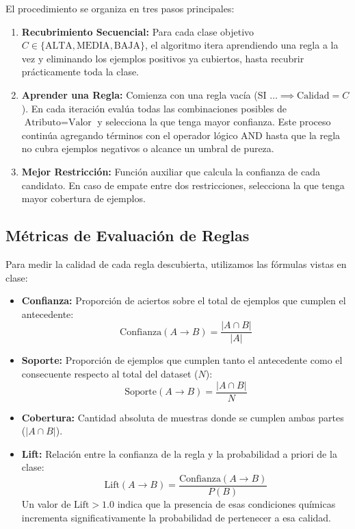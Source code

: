 \documentclass[11pt,a4paper]{article}
\begin{document}
El procedimiento se organiza en tres pasos principales:
\begin{enumerate}
    \item \textbf{Recubrimiento Secuencial:} Para cada clase objetivo $C \in \{\text{ALTA}, \text{MEDIA}, \text{BAJA}\}$, el algoritmo itera aprendiendo una regla a la vez y eliminando los ejemplos positivos ya cubiertos, hasta recubrir prácticamente toda la clase.
    \item \textbf{Aprender una Regla:} Comienza con una regla vacía ($\text{SI } \dots \implies \text{Calidad} = C$). En cada iteración evalúa todas las combinaciones posibles de $\text{Atributo} = \text{Valor}$ y selecciona la que tenga mayor confianza. Este proceso continúa agregando términos con el operador lógico AND hasta que la regla no cubra ejemplos negativos o alcance un umbral de pureza.
    \item \textbf{Mejor Restricción:} Función auxiliar que calcula la confianza de cada candidato. En caso de empate entre dos restricciones, selecciona la que tenga mayor cobertura de ejemplos.
\end{enumerate}

\subsection{Métricas de Evaluación de Reglas}
Para medir la calidad de cada regla descubierta, utilizamos las fórmulas vistas en clase:
\begin{itemize}
    \item \textbf{Confianza:} Proporción de aciertos sobre el total de ejemplos que cumplen el antecedente:
    \begin{equation}
    \text{Confianza}(A \to B) = \frac{|A \cap B|}{|A|}
    \end{equation}
    \item \textbf{Soporte:} Proporción de ejemplos que cumplen tanto el antecedente como el consecuente respecto al total del dataset ($N$):
    \begin{equation}
    \text{Soporte}(A \to B) = \frac{|A \cap B|}{N}
    \end{equation}
    \item \textbf{Cobertura:} Cantidad absoluta de muestras donde se cumplen ambas partes ($|A \cap B|$).
    \item \textbf{Lift:} Relación entre la confianza de la regla y la probabilidad a priori de la clase:
    \begin{equation}
    \text{Lift}(A \to B) = \frac{\text{Confianza}(A \to B)}{P(B)}
    \end{equation}
    Un valor de $\text{Lift} > 1.0$ indica que la presencia de esas condiciones químicas incrementa significativamente la probabilidad de pertenecer a esa calidad.
\end{itemize}
\end{document}
